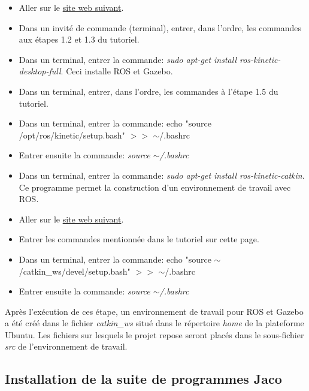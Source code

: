 \documentclass[root.tex]{subfiles}
\begin{document}
\begin{itemize}
\item Aller sur le \href{http://wiki.ros.org/kinetic/Installation/Ubuntu}{site web suivant}.
\item Dans un invité de commande (terminal), entrer, dans l'ordre, les commandes aux étapes 1.2 et 1.3 du tutoriel.
\item Dans un terminal, entrer la commande: \textit{sudo apt-get install ros-kinetic-desktop-full}. Ceci installe ROS et Gazebo.
\item Dans un terminal, entrer, dans l'ordre, les commandes à l'étape 1.5 du tutoriel.
\item Dans un terminal, entrer la commande: echo "source /opt/ros/kinetic/setup.bash" $>>$ $\sim$/.bashrc
\item Entrer ensuite la commande: \textit{source $\sim$/.bashrc}
\item Dans un terminal, entrer la commande: \textit{sudo apt-get install ros-kinetic-catkin}. Ce programme permet la construction d'un environnement de travail avec ROS.
\item Aller sur le \href{http://wiki.ros.org/catkin/Tutorials/create_a_workspace}{site web suivant}.
\item Entrer les commandes mentionnée dans le tutoriel sur cette page.
\item Dans un terminal, entrer la commande: echo "source $\sim$/catkin\_ws/devel/setup.bash" $>>$ $\sim$/.bashrc
\item Entrer ensuite la commande: \textit{source $\sim$/.bashrc}
\end{itemize}

Après l'exécution de ces étape, un environnement de travail pour ROS et Gazebo a été créé dans le fichier \textit{catkin\_ws} situé dans le répertoire \textit{home} de la plateforme Ubuntu.
Les fichiers sur lesquels le projet repose seront placés dans le sous-fichier \textit{src} de l'environnement de travail.

\subsection{Installation de la suite de programmes Jaco}




\newpage
\end{document}
